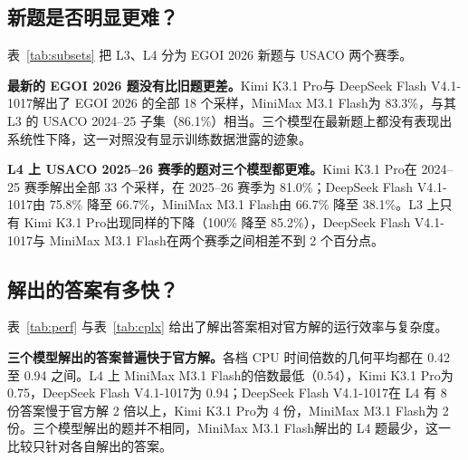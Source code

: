 \documentclass[11pt,a4paper,fontset=none]{ctexart}
\newcommand{\kimi}{Kimi K3.1 Pro}
\newcommand{\mini}{MiniMax M3.1 Flash}
\newcommand{\ds}{DeepSeek Flash V4.1-1017}
\newcommand{\lead}[1]{\textbf{#1}\quad}
\begin{document}
\subsection{新题是否明显更难？}

表~\ref{tab:subsets} 把 L3、L4 分为 EGOI 2026 新题与 USACO 两个赛季。

\begin{table}[t]
  \centering
  \caption{\textbf{新旧题对照（pass@1，\%）。}EGOI 2026 发布于 2026 年 5 月，晚于 USACO 的全部比赛。}
  \label{tab:subsets}
  \small
  
\end{table}

\lead{最新的 EGOI 2026 题没有比旧题更差。}\kimi 与 \ds 解出了 EGOI 2026 的全部 18 个采样，\mini 为 83.3\%，与其 L3 的 USACO 2024--25 子集（86.1\%）相当。三个模型在最新题上都没有表现出系统性下降，这一对照没有显示训练数据泄露的迹象。

\lead{L4 上 USACO 2025--26 赛季的题对三个模型都更难。}\kimi 在 2024--25 赛季解出全部 33 个采样，在 2025--26 赛季为 81.0\%；\ds 由 75.8\% 降至 66.7\%，\mini 由 66.7\% 降至 38.1\%。L3 上只有 \kimi 出现同样的下降（100\% 降至 85.2\%），\ds 与 \mini 在两个赛季之间相差不到 2 个百分点。

\subsection{解出的答案有多快？}

表~\ref{tab:perf} 与表~\ref{tab:cplx} 给出了解出答案相对官方解的运行效率与复杂度。

\begin{table}[t]
  \centering
  \caption{\textbf{运行效率（相对官方解，同语言）。}只比较解出的答案；倍数为各档的几何平均，小于 1 表示快于官方解。EGOI 与 FrontierCS 没有官方解，不参与比较。}
  \label{tab:perf}
  \small
  
\end{table}

\begin{table}[t]
  \centering
  \caption{\textbf{时间复杂度（相对官方解，答案数）。}按第 4.3 节的增长幂次 $k$ 分类；$k$ 中位数只统计更优、同阶与更差三类。}
  \label{tab:cplx}
  \small
  
\end{table}

\lead{三个模型解出的答案普遍快于官方解。}各档 CPU 时间倍数的几何平均都在 0.42 至 0.94 之间。L4 上 \mini 的倍数最低（0.54），\kimi 为 0.75，\ds 为 0.94；\ds 在 L4 有 8 份答案慢于官方解 2 倍以上，\kimi 为 4 份，\mini 为 2 份。三个模型解出的题并不相同，\mini 解出的 L4 题最少，这一比较只针对各自解出的答案。
\end{document}
